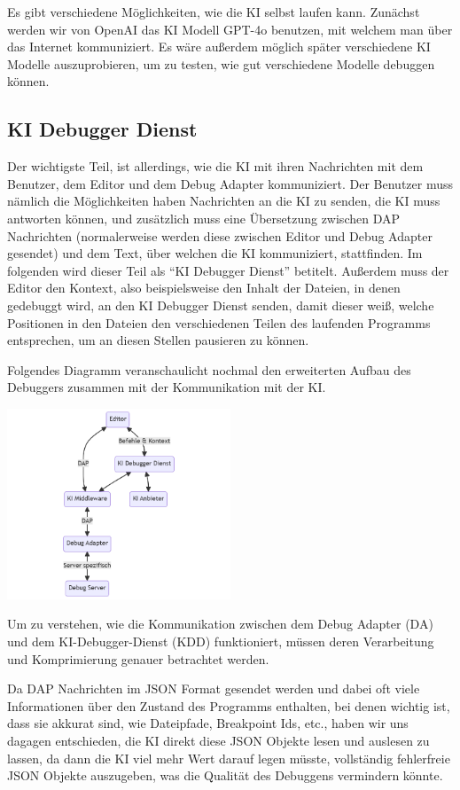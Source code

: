 \documentclass[a4paper,12pt,ngerman]{scrartcl}
\begin{document}
Es gibt verschiedene Möglichkeiten, wie die KI selbst laufen kann. Zunächst werden wir von OpenAI das KI Modell GPT-4o benutzen, mit welchem man über das Internet kommuniziert. Es wäre außerdem möglich später verschiedene KI Modelle auszuprobieren, um zu testen, wie gut verschiedene Modelle debuggen können.

\subsection{KI Debugger Dienst}

Der wichtigste Teil, ist allerdings, wie die KI mit ihren Nachrichten mit dem Benutzer, dem Editor und dem Debug Adapter kommuniziert. Der Benutzer muss nämlich die Möglichkeiten haben Nachrichten an die KI zu senden, die KI muss antworten können, und zusätzlich muss eine Übersetzung zwischen DAP Nachrichten (normalerweise werden diese zwischen Editor und Debug Adapter gesendet) und dem Text, über welchen die KI kommuniziert, stattfinden. Im folgenden wird dieser Teil als ``KI Debugger Dienst'' betitelt. Außerdem muss der Editor den Kontext, also beispielsweise den Inhalt der Dateien, in denen gedebuggt wird, an den KI Debugger Dienst senden, damit dieser weiß, welche Positionen in den Dateien den verschiedenen Teilen des laufenden Programms entsprechen, um an diesen Stellen pausieren zu können.

Folgendes Diagramm veranschaulicht nochmal den erweiterten Aufbau des Debuggers zusammen mit der Kommunikation mit der KI.

\begin{center}	
	\includegraphics[width=0.5\textwidth]{ai_integration}
\end{center}

Um zu verstehen, wie die Kommunikation zwischen dem Debug Adapter (DA) und dem KI-Debugger-Dienst (KDD) funktioniert, müssen deren Verarbeitung und Komprimierung genauer betrachtet werden.

Da DAP Nachrichten im JSON Format gesendet werden und dabei oft viele Informationen über den Zustand des Programms enthalten, bei denen wichtig ist, dass sie akkurat sind, wie Dateipfade, Breakpoint Ids, etc., haben wir uns dagagen entschieden, die KI direkt diese JSON Objekte lesen und auslesen zu lassen, da dann die KI viel mehr Wert darauf legen müsste, vollständig fehlerfreie JSON Objekte auszugeben, was die Qualität des Debuggens vermindern könnte.
\end{document}
